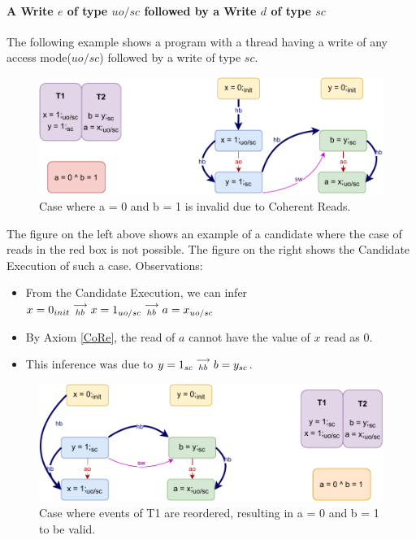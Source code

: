 
    \paragraph{A Write $e$ of type $uo/sc$ followed by a Write $d$ of type $sc$}
        
        The following example shows a program with a thread having a write of any access mode($uo/sc$) followed by a write of type $sc$.
        \begin{figure}[H]
            \centering
            \includegraphics[scale=0.7]{InstructionReordering/Example7(Wuo,sc-Wsc).pdf}
            \caption{Case where a = 0 and b = 1 is invalid due to Coherent Reads.}
        \end{figure}
        The figure on the left above shows an example of a candidate where the case of reads in the red box is not possible. 
        The figure on the right shows the Candidate Execution of such a case. 
        Observations:
        \begin{itemize}
            \item From the Candidate Execution, we can infer $x=0_{init}\stackrel{\longrightarrow}{_{hb}}x=1_{uo/sc}\stackrel{\longrightarrow}{_{hb}}a=x_{uo/sc}$
            \item By Axiom \ref{CoRe}, the read of $a$ cannot have the value of $x$ read as $0$. 
            \item This inference was due to $y=1_{sc}\stackrel{\longrightarrow}{_{hb}}b=y_{sc}$.
        \end{itemize}

        \begin{figure}[H]
            \centering
            \includegraphics[scale=0.7]{InstructionReordering/Example7R(Wuo,sc-Wsc).pdf}
            \caption{Case where events of T1 are reordered, resulting in  a = 0 and b = 1 to be valid.}
        \end{figure}
        
